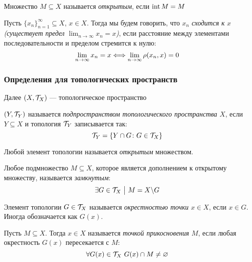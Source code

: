 \begin{definition}
	Множество $M \subseteq X$ называется \textit{открытым}, если $\operatorname{int} M = M$
\end{definition}

\begin{definition}
	Пусть $\{x_n\}_{n = 1}^\infty \subseteq X$, $x \in X$. Тогда мы будем говорить, что \textit{$x_n$ сходится к $x$ (существует предел $\lim_{n \to \infty} x_n = x$)}, если расстояние между элементами последовательности и пределом стремится к нулю:
	\[
		\lim_{n \to \infty} x_n = x \Longleftrightarrow \lim_{n \to \infty} \rho(x_n, x) = 0
	\]
\end{definition}

\subsubsection*{Определения для топологических пространств}

\begin{note}
	Далее $(X, \mathcal{T}_X)$ --- топологическое пространство
\end{note}

\begin{definition}
	$(Y, \mathcal{T}_Y)$ называется \textit{подпространством топологического пространства $X$}, если $Y \subseteq X$ и топология $\mathcal{T}_Y$ записывается так:
	\[
		\mathcal{T}_Y = \{Y \cap G \colon G \in \mathcal{T}_X\}
	\]
\end{definition}

\begin{definition}
	Любой элемент топологии называется \textit{открытым} множеством.
\end{definition}

\begin{definition}
	Любое подмножество $M \subseteq X$, которое является дополнением к открытому множеству, называется \textit{замкнутым}:
	\[
		\exists G \in \mathcal{T}_X \ \big|\  M = X \backslash G
	\]
\end{definition}

\begin{definition}
	Элемент топологии $G \in \mathcal{T}_X$ называется \textit{окрестностью точки $x \in X$}, если $x \in G$. Иногда обозначается как $G(x)$.
\end{definition}

\begin{definition}
	Пусть $M \subseteq X$. Тогда $x \in X$ называется \textit{точкой прикосновения $M$}, если любая окрестность $G(x)$ пересекается с $M$:
	\[
		\forall G(x) \in \mathcal{T}_X\ G(x) \cap M \neq \varnothing
	\]
\end{definition}

